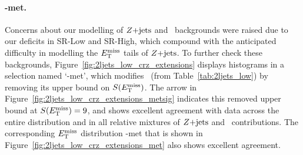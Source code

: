 \paragraph{\crz-met.}
Concerns about our modelling of $Z\mathrm{+jets}$ and \diboson\ backgrounds were
raised due to our deficits in SR-Low and SR-High, which compound with the
anticipated difficulty in modelling the $E_\mathrm{T}^\mathrm{miss}$ tails of $Z\mathrm{+jets}$.
To further check these backgrounds, Figure~\ref{fig:2ljets_low_crz_extensions}
displays histograms in a selection named `\crz-met', which modifies \crz\
(from Table~\ref{tab:2ljets_low}) by removing its upper bound on $S(E_\mathrm{T}^\mathrm{miss})$.
The arrow in Figure~\ref{fig:2ljets_low_crz_extensions_metsig} indicates this
removed upper bound at $S(E_\mathrm{T}^\mathrm{miss}) = 9$, and shows excellent agreement with data
across the entire distribution and in all relative mixtures of $Z\mathrm{+jets}$ and
\diboson\ contributions.
The corresponding $E_\mathrm{T}^\mathrm{miss}$ distribution \crz-met that is shown in
Figure~\ref{fig:2ljets_low_crz_extensions_met}
also shows excellent agreement.

